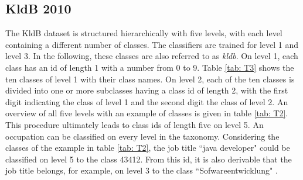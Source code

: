 \documentclass[12pt, a4paper, titlepage]{article}
\begin{document}
\subsection{KldB 2010}
The \ac{KldB} dataset is structured hierarchically with five levels, with each level containing a different number of classes. The classifiers are trained for level 1 and level 3. In the following, these classes are also referred to as \textit{kldb}. On level 1, each class has an id of length 1 with a number from 0 to 9. Table \ref{tab: T3} shows the ten classes of level 1 with their class names. On level 2, each of the ten classes is divided into one or more subclasses having a class id of length 2, with the first digit indicating the class of level 1 and the second digit the class of level 2. An overview of all five levels with an example of classes is given in table \ref{tab: T2}. This procedure ultimately leads to class ids of length five on level 5. An occupation can be classified on every level in the taxonomy. Considering the classes of the example in table \ref{tab: T2}, the job title ``java developer" could be classified on level 5 to the class 43412. From this id, it is also derivable that the job title belongs, for example, on level 3 to the class ``Sofwareentwicklung" \citep{Bundesagentur2011a, Bundesagentur2011b, Paulus2013}.

  \begin{table}[]
    \center
    \caption[Levels of KldB with Examples for each Level]{\label{tab: T2} Levels of KldB with Examples for each Level (adapted from \citep[8]{Bundesagentur2011a})}
    \end{table}
\end{document}
